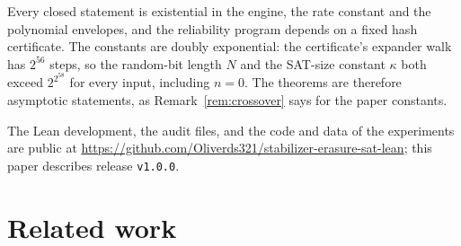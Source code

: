 \documentclass[11pt]{article}
\theoremstyle{remark}
\begin{document}
Every closed statement is existential in the engine, the rate constant
and the polynomial envelopes, and the reliability program depends on a
fixed hash certificate. The constants are doubly exponential: the
certificate's expander walk has \(2^{56}\) steps, so the random-bit
length \(N\) and the SAT-size constant \(\kappa\) both exceed
\(2^{2^{58}}\) for every input, including \(n=0\). The theorems are
therefore asymptotic statements, as Remark~\ref{rem:crossover} says for
the paper constants.

The Lean development, the audit files, and the code and data of the
experiments are public at
\url{https://github.com/Oliverds321/stabilizer-erasure-sat-lean}; this paper
describes release \texttt{v1.0.0}.

\section{Related work}
\label{sec:related}
\end{document}
